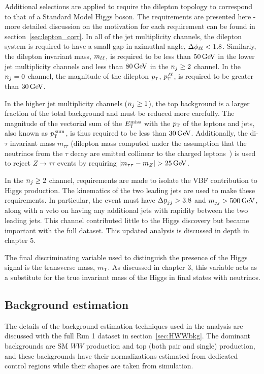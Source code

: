 Additional selections are applied to require the dilepton topology to correspond to that of a Standard Model Higgs boson. The requirements are presented here - more detailed discussion on the motivation for each requirement can be found in section~\ref{sec:lepton_corr}. In all of the jet multiplicity channels, the dilepton system is required to have a small gap in azimuthal angle, $\Delta\phi_{\ell\ell} < 1.8$. Similarly, the dilepton invariant mass, $m_{\ell\ell}$, is required to be less than $50 \GeV$ in the lower jet multiplicity channels and less than $80 \GeV$ in the $n_j \geq 2$ channel.  In the $n_j = 0$ channel, the magnitude of the dilepton $p_{\textrm{\footnotesize\sc t}}$, $p_{\textrm{\footnotesize\sc t}}^{\,\ell\ell}$, is required to be greater than $30 \GeV$. 

In the higher jet multiplicity channels ($n_j \geq 1$), the top background is a larger fraction of the total background and must be reduced more carefully. The magnitude of the vectorial sum of the $E_{\textrm{\footnotesize\sc t}}^{\rm miss}$ with the $p_{\textrm{\footnotesize\sc t}}$ of the leptons and jets, also known as $p_{\textrm{\footnotesize\sc t}}^{\,\rm sum}$, is thus required to be less than $30 \GeV$. Additionally, the di-$\tau$ invariant mass $m_{\tau\tau}$ (dilepton mass computed under the assumption that the neutrinos from the $\tau$ decay are emitted collinear to the charged leptons~\cite{collinear}) is used to reject $Z\to\tau\tau$ events by requiring $|m_{\tau\tau} - m_{Z}| > 25 \GeV$.  

In the $n_j \geq 2$ channel, requirements are made to isolate the VBF contribution to Higgs production. The kinematics of the two leading jets are used to make these requirements. In particular, the event must have $\dyjj > 3.8$ and $\mjj > 500 \GeV$, along with a veto on having any additional jets with rapidity between the two leading jets. This channel contributed little to the Higgs discovery but became important with the full dataset. This updated analysis is discussed in depth in chapter 5. 

The final discriminating variable used to distinguish the presence of the Higgs signal is the transverse mass, $m_{\textrm{\footnotesize\sc t}}$. As discussed in chapter 3, this variable acts as a substitute for the true invariant mass of the Higgs in final states with neutrinos. 

\subsection{Background estimation}

The details of the background estimation techniques used in the \HWWfull analysis are discussed with the full Run 1 dataset in section~\ref{sec:HWWbkg}. The dominant backgrounds are SM $WW$ production and top (both pair and single) production, and these backgrounds have their normalizations estimated from dedicated control regions while their shapes are taken from simulation. 

